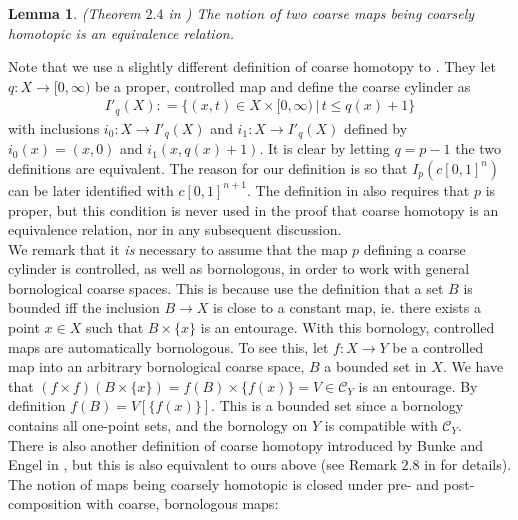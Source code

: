 \documentclass[a4paper,11pt]{article}
\theoremstyle{definition}
\theoremstyle{plain}
\newtheorem{lemma}[definition]{Lemma}
\theoremstyle{remark}
\begin{document}
\begin{lemma} (Theorem $2.4$ in \cite{mitchener2020coarse}) The notion of two coarse maps being coarsely homotopic is an equivalence relation.
\end{lemma}

Note that we use a slightly different definition of coarse homotopy to \cite{mitchener2020coarse}. They let $q: X\rightarrow [0,\infty)$ be a proper, controlled map and define the coarse cylinder as
\begin{align*}
I'_{q}(X): = \{(x,t)\in X\times [0,\infty)\,|\,t\leq q(x) +1\}
\end{align*} 
with inclusions $i_{0}: X\rightarrow I'_{q}(X)$ and $i_1: X\rightarrow I'_{q}(X)$ defined by $i_{0}(x) = (x,0)$ and $i_{1}(x,q(x)+1)$. It is clear by letting $q = p-1$ the two definitions are equivalent. The reason for our definition is so that $I_{p}(c[0,1]^n)$ can be later identified with $c[0,1]^{n+1}$. The definition in \cite{mitchener2020coarse} also requires that $p$ is proper, but this condition is never used in the proof that coarse homotopy is an equivalence relation, nor in any subsequent discussion. \\

We remark that it \textit{is} necessary to assume that the map $p$ defining a coarse cylinder is controlled, as well as bornologous, in order to work with general bornological coarse spaces. This is because \cite{mitchener2020coarse} use the definition that a set $B$ is bounded iff the inclusion $B\rightarrow X$ is close to a constant map, ie. there exists a point $x \in X$ such that $B \times \{x\}$ is an entourage. With this bornology, controlled maps are automatically bornologous. To see this, let $f: X\rightarrow Y$ be a controlled map into an arbitrary bornological coarse space, $B$ a bounded set in $X$. We have that $(f\times f)(B \times \{x\}) = f(B) \times \{f(x)\} = V \in \mathcal{C}_{Y}$ is an entourage. By definition $f(B) = V[\{f(x)\}]$. This is a bounded set since a bornology contains all one-point sets, and the bornology on $Y$ is compatible with $\mathcal{C}_{Y}$. \\

There is also another definition of coarse homotopy introduced by Bunke and Engel in \cite{bunke2020homotopy}, but this is also equivalent to ours above (see Remark $2.8$ in  \cite{weighill2025liftingcoarsehomotopies} for details). \\

The notion of maps being coarsely homotopic is closed under pre- and post-composition with coarse, bornologous maps:
\end{document}
